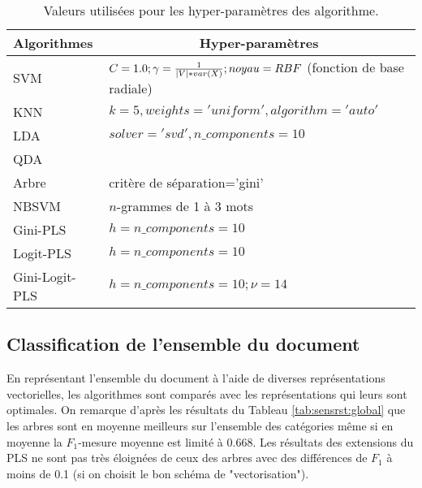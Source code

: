 \begin{table}[htb]
	\scriptsize
	\centering
	\begin{tabular}{|l|p{}|}
		\hline
		Algorithmes & \multicolumn{1}{|c|}{Hyper-paramètres}\\ \hline
		SVM & $C=1.0; \gamma=\frac{1}{{\vert V\vert} * var(X)}; noyau=RBF$ (fonction de base radiale)\\ \hline
		KNN & $k = 5, weights='uniform', algorithm='auto'$ \\ \hline
		LDA & $solver='svd', n\_components=10$ \\ \hline
		QDA & \\ \hline
		Arbre & critère de séparation='gini' \\ \hline
		NBSVM & $n$-grammes de 1 à 3 mots  \\ \hline
		Gini-PLS & $h=n\_components=10$ \\ \hline
		Logit-PLS & $h=n\_components=10$ \\ \hline
		Gini-Logit-PLS & $h=n\_components=10; \nu = 14$ \\ \hline
	\end{tabular}
	\caption{Valeurs utilisées pour les hyper-paramètres des algorithme.}\label{tab:sensrst:metapara}
\end{table}

%
\subsection{Classification de l'ensemble du document}

En représentant l'ensemble du document à l'aide de diverses représentations vectorielles, les algorithmes sont comparés avec les représentations qui leurs sont optimales. On remarque d'après les résultats du Tableau \ref{tab:sensrst:global} que les arbres sont en moyenne meilleurs sur l'ensemble des catégories même si en moyenne la $F_1$-mesure moyenne est limité à 0.668. Les résultats des extensions du PLS ne sont pas très éloignées de ceux des arbres avec des différences de $F_1$ à moins de 0.1 (si on choisit le bon schéma de "vectorisation").

